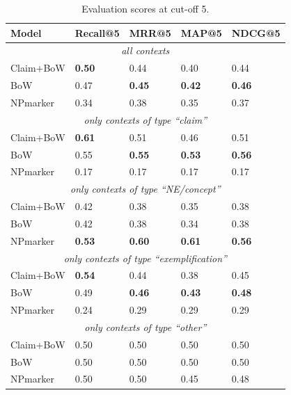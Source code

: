 \begin{table}[p!]
\centering
    \caption{Evaluation scores at cut-off 5.}
    \label{tab:userevalnumbers}
\begin{center}
    \begin{tabular}{lllll}
    \toprule
    Model & Recall@5 & MRR@5 & MAP@5 & NDCG@5 \\
    \midrule
    \multicolumn{5}{c}{\emph{all contexts}} \\
    \midrule
    Claim+BoW & \textbf{0.50} & 0.44 & 0.40 & 0.44 \\
    BoW       & 0.47 & \textbf{0.45} & \textbf{0.42} & \textbf{0.46} \\
    NPmarker  & 0.34 & 0.38 & 0.35 & 0.37 \\
    \midrule
    \multicolumn{5}{c}{\emph{only contexts of type ``claim''}} \\
    \midrule
    Claim+BoW & \textbf{0.61} & 0.51 & 0.46 & 0.51 \\
    BoW       & 0.55 & \textbf{0.55} & \textbf{0.53} & \textbf{0.56} \\
    NPmarker  & 0.17 & 0.17 & 0.17 & 0.17 \\
    \midrule
    \multicolumn{5}{c}{\emph{only contexts of type ``NE/concept''}} \\
    \midrule
    Claim+BoW & 0.42 & 0.38 & 0.35 & 0.38 \\
    BoW       & 0.42 & 0.38 & 0.34 & 0.38 \\
    NPmarker  & \textbf{0.53} & \textbf{0.60} & \textbf{0.61} & \textbf{0.56} \\
    \midrule
    \multicolumn{5}{c}{\emph{only contexts of type ``exemplification''}} \\
    \midrule
    Claim+BoW & \textbf{0.54} & 0.44 & 0.38 & 0.45 \\
    BoW       & 0.49 & \textbf{0.46} & \textbf{0.43} & \textbf{0.48} \\
    NPmarker  & 0.24 & 0.29 & 0.29 & 0.29 \\
    \midrule
    \multicolumn{5}{c}{\emph{only contexts of type ``other''}} \\
    \midrule
    Claim+BoW & 0.50 & 0.50 & 0.50 & 0.50 \\
    BoW       & 0.50 & 0.50 & 0.50 & 0.50 \\
    NPmarker  & 0.50 & 0.50 & 0.45 & 0.48 \\
    \bottomrule
    \end{tabular}
\end{center}
\end{table}


